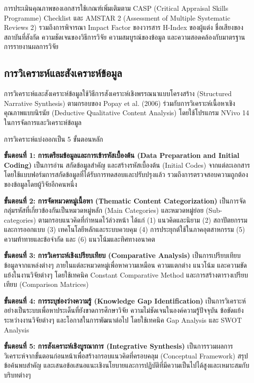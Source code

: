 \documentclass[a4paper]{article}
\begin{document}
การประเมินคุณภาพของเอกสารใช้เกณฑ์เพิ่มเติมตาม CASP (Critical Appraisal Skills Programme) Checklist และ AMSTAR 2 (Assessment of Multiple Systematic Reviews 2) รวมถึงการพิจารณา Impact Factor ของวารสาร H-Index ของผู้แต่ง ชื่อเสียงของสถาบันที่สังกัด ความชัดเจนของวิธีการวิจัย ความสมบูรณ์ของข้อมูล และความสอดคล้องกับมาตรฐานการรายงานผลการวิจัย

\subsection{การวิเคราะห์และสังเคราะห์ข้อมูล}

การวิเคราะห์และสังเคราะห์ข้อมูลใช้วิธีการสังเคราะห์เชิงพรรณนาแบบโครงสร้าง (Structured Narrative Synthesis) ตามกรอบของ Popay et al. (2006) ร่วมกับการวิเคราะห์เนื้อหาเชิงคุณภาพแบบนิรนัย (Deductive Qualitative Content Analysis) โดยใช้โปรแกรม NVivo 14 ในการจัดการและวิเคราะห์ข้อมูล

การวิเคราะห์แบ่งออกเป็น 5 ขั้นตอนหลัก

\textbf{ขั้นตอนที่ 1: การเตรียมข้อมูลและการเข้ารหัสเบื้องต้น (Data Preparation and Initial Coding)} เป็นการอ่าน สกัดข้อมูลสำคัญ และสร้างรหัสเบื้องต้น (Initial Codes) จากแต่ละเอกสารโดยใช้แบบฟอร์มการสกัดข้อมูลที่ได้รับการทดสอบและปรับปรุงแล้ว รวมถึงการตรวจสอบความถูกต้องของข้อมูลโดยผู้วิจัยอีกคนหนึ่ง

\textbf{ขั้นตอนที่ 2: การจัดหมวดหมู่เนื้อหา (Thematic Content Categorization)} เป็นการจัดกลุ่มรหัสที่เกี่ยวข้องกันเป็นหมวดหมู่หลัก (Main Categories) และหมวดหมู่ย่อย (Sub-categories) ตามกรอบแนวคิดที่กำหนดไว้ล่วงหน้า ได้แก่ (1) แนวคิดและนิยาม (2) สถาปัตยกรรมและการออกแบบ (3) เทคโนโลยีหลักและระบบควบคุม (4) การประยุกต์ใช้ในภาคอุตสาหกรรม (5) ความท้าทายและข้อจำกัด และ (6) แนวโน้มและทิศทางอนาคต

\textbf{ขั้นตอนที่ 3: การวิเคราะห์เชิงเปรียบเทียบ (Comparative Analysis)} เป็นการเปรียบเทียบข้อมูลจากแหล่งต่างๆ ภายในแต่ละหมวดหมู่เพื่อหาความเหมือน ความแตกต่าง แนวโน้ม และความขัดแย้งในงานวิจัยต่างๆ โดยใช้เทคนิค Constant Comparative Method และการสร้างตารางเปรียบเทียบ (Comparison Matrices)

\textbf{ขั้นตอนที่ 4: การระบุช่องว่างความรู้ (Knowledge Gap Identification)} เป็นการวิเคราะห์อย่างเป็นระบบเพื่อหาประเด็นที่ยังขาดการศึกษาวิจัย ความไม่ชัดเจนในองค์ความรู้ปัจจุบัน ข้อขัดแย้งระหว่างงานวิจัยต่างๆ และโอกาสในการพัฒนาต่อไป โดยใช้เทคนิค Gap Analysis และ SWOT Analysis

\textbf{ขั้นตอนที่ 5: การสังเคราะห์เชิงบูรณาการ (Integrative Synthesis)} เป็นการรวมผลการวิเคราะห์จากขั้นตอนก่อนหน้าเพื่อสร้างกรอบแนวคิดที่ครอบคลุม (Conceptual Framework) สรุปข้อค้นพบสำคัญ และเสนอข้อเสนอแนะเชิงนโยบายและการปฏิบัติที่มีความเป็นไปได้สูงและเหมาะสมกับบริบทต่างๆ
\end{document}
